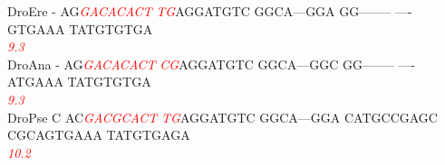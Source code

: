 \documentclass[11pt,twoside,reqno,a4paper]{article}
\begin{document}
{DroEre	-	AG\textit{\textcolor{Red}{G}}\textit{\textcolor{Red}{A}}\textit{\textcolor{Red}{C}}\textit{\textcolor{Red}{A}}\textit{\textcolor{Red}{C}}\textit{\textcolor{Red}{A}}\textit{\textcolor{Red}{C}}\textit{\textcolor{Red}{T}}	\textit{\textcolor{Red}{T}}\textit{\textcolor{Red}{G}}AGGATGTC	GGCA---GGA	GG--------	----GTGAAA	TATGTGTGA\\
\hspace*{7\charwidth}\hspace*{1\charwidth}\hspace*{3\charwidth}\textit{\textcolor{Red}{9.3}}\hspace*{1\charwidth}\hspace*{1\charwidth}\hspace*{1\charwidth}\hspace*{1\charwidth}\hspace*{1\charwidth}\\
DroAna	-	AG\textit{\textcolor{Red}{G}}\textit{\textcolor{Red}{A}}\textit{\textcolor{Red}{C}}\textit{\textcolor{Red}{A}}\textit{\textcolor{Red}{C}}\textit{\textcolor{Red}{A}}\textit{\textcolor{Red}{C}}\textit{\textcolor{Red}{T}}	\textit{\textcolor{Red}{C}}\textit{\textcolor{Red}{G}}AGGATGTC	GGCA---GGC	GG--------	----ATGAAA	TATGTGTGA\\
\hspace*{7\charwidth}\hspace*{1\charwidth}\hspace*{3\charwidth}\textit{\textcolor{Red}{9.3}}\hspace*{1\charwidth}\hspace*{1\charwidth}\hspace*{1\charwidth}\hspace*{1\charwidth}\hspace*{1\charwidth}\\
DroPse	C	AC\textit{\textcolor{Red}{G}}\textit{\textcolor{Red}{A}}\textit{\textcolor{Red}{C}}\textit{\textcolor{Red}{G}}\textit{\textcolor{Red}{C}}\textit{\textcolor{Red}{A}}\textit{\textcolor{Red}{C}}\textit{\textcolor{Red}{T}}	\textit{\textcolor{Red}{T}}\textit{\textcolor{Red}{G}}AGGATGTC	GGCA---GGA	CATGCCGAGC	CGCAGTGAAA	TATGTGAGA\\
\hspace*{7\charwidth}\hspace*{1\charwidth}\hspace*{3\charwidth}\textit{\textcolor{Red}{10.2}}\hspace*{1\charwidth}\hspace*{1\charwidth}\hspace*{1\charwidth}\hspace*{1\charwidth}\hspace*{1\charwidth}\\
}
\end{document}
